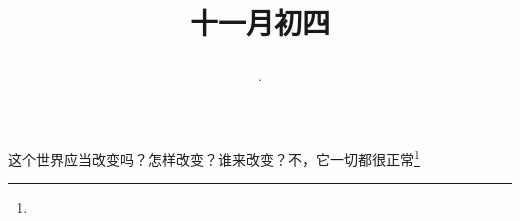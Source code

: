 \title{\date[d=4,m=12,y=2024][year:cn-y,年,month:cn,day:cn,日,·,weekday]·十一月初四 }
这个世界应当改变吗？怎样改变？谁来改变？不，它一切都很正常\footnote{ }

